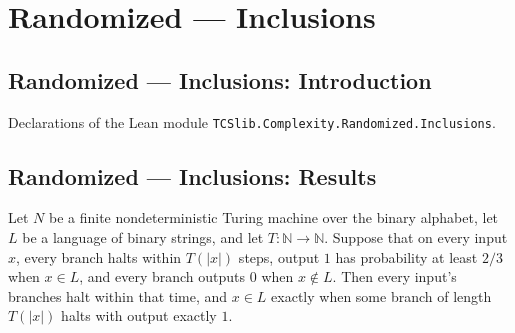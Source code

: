 \section{Randomized --- Inclusions}
\subsection*{Randomized --- Inclusions: Introduction}

Declarations of the Lean module \texttt{TCSlib.Complexity.Randomized.Inclusions}.

\subsection*{Randomized --- Inclusions: Results}

\begin{theorem}
\label{Turing.FinNDTM.RDecidesInTime.decidesInTime}
\leanok
{}
Let $N$ be a finite nondeterministic Turing machine over the binary alphabet, let $L$ be
a language of binary strings, and let $T:\mathbb{N}\to\mathbb{N}$. Suppose that on every
input $x$, every branch halts within $T(|x|)$ steps, output $1$ has probability at least
$2/3$ when $x\in L$, and every branch outputs $0$ when $x\notin L$. Then every input's
branches halt within that time, and $x\in L$ exactly when some branch of length $T(|x|)$
halts with output exactly $1$.
\end{theorem}

